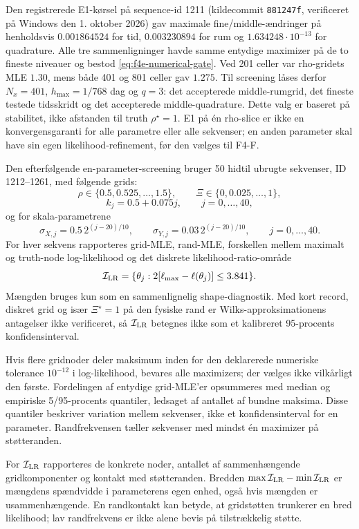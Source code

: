 Den registrerede E1-kørsel på sequence-id 1211 (kildecommit
\texttt{881247f}, verificeret på Windows den 1. oktober 2026) gav maximale
fine/middle-ændringer på henholdsvis \(0.001864524\) for tid,
\(0.003230894\) for rum og \(1.634248\cdot10^{-13}\) for quadrature.
Alle tre sammenligninger havde samme entydige maximizer på de to fineste niveauer
og bestod \eqref{eq:f4e-numerical-gate}. Ved 201 celler var rho-gridets MLE
\(1.30\), mens både 401 og 801 celler gav \(1.275\).
Til screening låses derfor \(N_x=401\), \(h_{\max}=1/768\) dag og \(q=3\):
det accepterede middle-rumgrid, det fineste testede tidsskridt og det accepterede
middle-quadrature. Dette valg er baseret på stabilitet, ikke afstanden til truth
\(\rho^\star=1\). E1 på én rho-slice er ikke en konvergensgaranti for alle
parametre eller alle sekvenser; en anden parameter skal have sin egen
likelihood-refinement, før den vælges til F4-F.

Den efterfølgende en-parameter-screening bruger 50 hidtil ubrugte sekvenser,
ID 1212--1261, med følgende grids:
\[
 \rho\in\{0.5,0.525,\ldots,1.5\},\qquad
 \Xi\in\{0,0.025,\ldots,1\},
\]
\[
 k_j=0.5+0.075j,\qquad j=0,\ldots,40,
\]
og for skala-parametrene
\[
 \sigma_{X,j}=0.5\,2^{(j-20)/10},\qquad
 \sigma_{Y,j}=0.03\,2^{(j-20)/10},\qquad j=0,\ldots,40.
\]
For hver sekvens rapporteres grid-MLE, rand-MLE, forskellen mellem maximalt og
truth-node log-likelihood og det diskrete likelihood-ratio-område
\begin{equation}
 \mathcal I_{\rm LR}
 =\{\theta_j:2[\ell_{\max}-\ell(\theta_j)]\le3.841\}.
 \label{eq:f4e-lr-set}
\end{equation}
Mængden bruges kun som en sammenlignelig shape-diagnostik. Med kort record, diskret
grid og især \(\Xi^\star=1\) på den fysiske rand er Wilks-approksimationens antagelser
ikke verificeret, så \(\mathcal I_{\rm LR}\) betegnes ikke som et kalibreret
95-procents konfidensinterval.

Hvis flere gridnoder deler maksimum inden for den deklarerede numeriske
tolerance \(10^{-12}\) i log-likelihood, bevares alle maximizers; der vælges
ikke vilkårligt den første. Fordelingen af entydige grid-MLE'er opsummeres med
median og empiriske 5/95-procents quantiler, ledsaget af antallet af bundne
maksima. Disse quantiler beskriver variation mellem sekvenser, ikke et
konfidensinterval for en parameter. Randfrekvensen tæller sekvenser med mindst
én maximizer på støtteranden.

For \(\mathcal I_{\rm LR}\) rapporteres de konkrete noder, antallet af
sammenhængende gridkomponenter og kontakt med støtteranden. Bredden
\(\max\mathcal I_{\rm LR}-\min\mathcal I_{\rm LR}\) er mængdens spændvidde i
parameterens egen enhed, også hvis mængden er usammenhængende. En randkontakt
kan betyde, at gridstøtten trunkerer en bred likelihood; lav randfrekvens er
ikke alene bevis på tilstrækkelig støtte.

